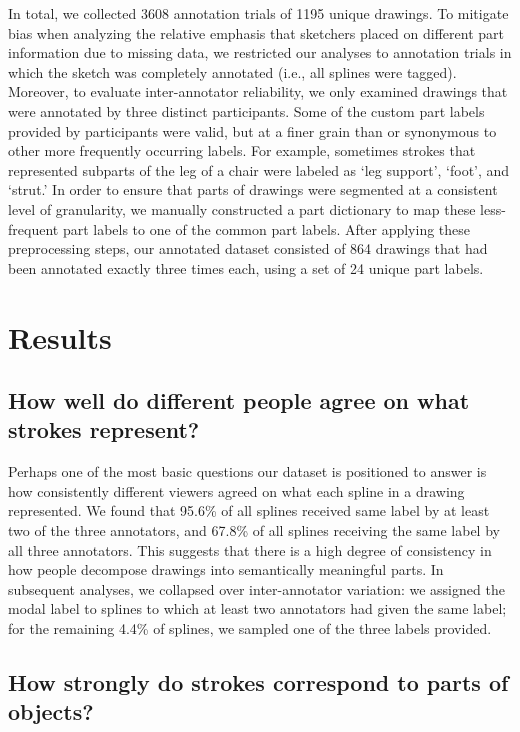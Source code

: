 \documentclass[10pt,letterpaper]{article}
\begin{document}
In total, we collected 3608 annotation trials of 1195 unique drawings.
To mitigate bias when analyzing the relative emphasis that sketchers placed on different part information due to missing data, we restricted our analyses to annotation trials in which the sketch was completely annotated (i.e., all splines were tagged). 
Moreover, to evaluate inter-annotator reliability, we only examined drawings that were annotated by three distinct participants. 
Some of the custom part labels provided by participants were valid, but at a finer grain than or synonymous to other more frequently occurring labels. 
For example, sometimes strokes that represented subparts of the leg of a chair were labeled as `leg support', `foot', and `strut.'
In order to ensure that parts of drawings were segmented at a consistent level of granularity, we manually constructed a part dictionary to map these less-frequent part labels to one of the common part labels. 
After applying these preprocessing steps, our annotated dataset consisted of 864 drawings that had been annotated exactly three times each, using a set of 24 unique part labels. 


\section{Results}

\subsection{How well do different people agree on what strokes represent?}

Perhaps one of the most basic questions our dataset is positioned to answer is how consistently different viewers agreed on what each spline in a drawing represented. 
We found that 95.6\% of all splines received same label by at least two of the three annotators, and 67.8\% of all splines receiving the same label by all three annotators. 
This suggests that there is a high degree of consistency in how people decompose drawings into semantically meaningful parts. 
In subsequent analyses, we collapsed over inter-annotator variation: we assigned the modal label to splines to which at least two annotators had given the same label; for the remaining 4.4\% of splines, we sampled one of the three labels provided.

\subsection{How strongly do strokes correspond to parts of objects?}
\end{document}
